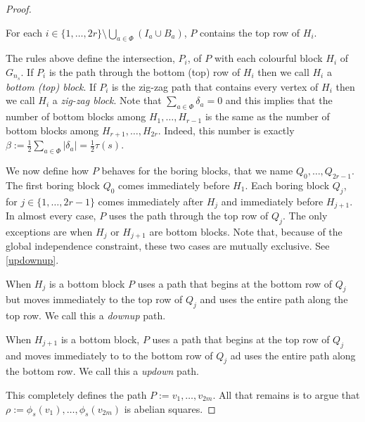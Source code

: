 \documentclass{patmorin}
\begin{document}
\begin{proof}
\begin{compactenum}
        \item For each $i\in\{1,\ldots,2r\}\setminus\bigcup_{a\in\Phi}(I_a\cup B_a)$, $P$ contains the top row of $H_i$.
    \end{compactenum}
    The rules above define the intersection, $P_i$, of $P$ with each colourful block $H_i$ of $G_{n_s}$.  If $P_i$ is the path through the bottom (top) row of $H_i$ then we call $H_i$ a \emph{bottom (top) block}.  If $P_i$ is the zig-zag path that contains every vertex of $H_i$ then we call $H_i$ a \emph{zig-zag block}.  Note that $\sum_{a\in\Phi} \delta_a = 0$ and this implies that the number of bottom blocks among $H_1,\ldots,H_{r-1}$ is the same as the number of bottom blocks among $H_{r+1},\ldots,H_{2r}$.  Indeed, this number is exactly $\beta:=\tfrac{1}{2}\sum_{a\in\Phi} |\delta_a|=\tfrac{1}{2}\tau(s)$.

    We now define how $P$ behaves for the boring blocks, that we name $Q_0,\ldots,Q_{2r-1}$. The first boring block $Q_0$ comes immediately before $H_1$. Each boring block $Q_j$, for $j\in\{1,\ldots,2r-1\}$ comes immediately after $H_j$ and immediately before $H_{j+1}$.  In almost every case, $P$ uses the path through the top row of $Q_j$.  The only exceptions are when $H_j$ or $H_{j+1}$ are bottom blocks. Note that, because of the global independence constraint, these two cases are mutually exclusive. See \cref{updownup}.

    \begin{figure}
    \end{figure}

    \begin{compactenum}
        \item When $H_j$ is a bottom block $P$ uses a path that begins at the bottom row of $Q_j$ but moves immediately to the top row of $Q_j$ and uses the entire path along the top row. We call this a \emph{downup} path.
        \item When $H_{j+1}$ is a bottom block, $P$ uses a path that begins at the top row of $Q_j$ and moves immediately to to the bottom row of $Q_j$ ad uses the entire path along the bottom row.  We call this a \emph{updown} path.
    \end{compactenum}
    This completely defines the path $P:=v_1,\ldots,v_{2m}$. All that remains is to argue that $\rho:=\phi_s(v_1),\ldots,\phi_s(v_{2m})$ is abelian squares.


\end{proof}
\end{document}
